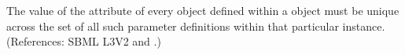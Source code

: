 The value of the attribute  of every \LocalParameter object
defined within a \KineticLaw object must be unique across the set of all
such parameter definitions within that particular \KineticLaw instance.
(References: SBML L3V2  and
.)
